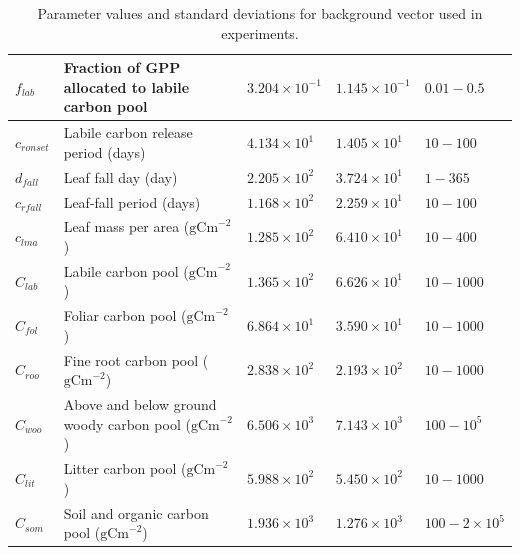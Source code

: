 \begin{table}[ht]
\begin{center}
\begin{tabular}{| l | p{4.5cm} | p{1.7cm} | p{1.7cm} | p{1.7cm} |}
$f_{lab}$ & Fraction of GPP allocated to labile carbon pool & $3.204\times 10^{-1}$ & $1.145\times 10^{-1}$ & $0.01 - 0.5$ \\ \hline
$c_{ronset}$ & Labile carbon release period (days) & $4.134\times 10^{1}$ & $1.405\times 10^{1}$ & $10 - 100$ \\ \hline
$d_{fall}$ & Leaf fall day (day) & $2.205\times 10^{2}$ & $3.724\times 10^{1}$ & $1 - 365$ \\ \hline
$c_{rfall}$ & Leaf-fall period (days) & $1.168\times 10^{2}$ & $2.259\times 10^{1}$ & $10 - 100$ \\ \hline
$c_{lma}$ & Leaf mass per area ($\text{gCm}^{-2}$) & $1.285\times 10^{2}$ & $6.410\times 10^{1}$ & $10 - 400$ \\ \hline
$C_{lab}$ & Labile carbon pool ($\text{gCm}^{-2}$) & $1.365\times 10^{2}$ & $6.626\times 10^{1}$ & $10 - 1000$ \\ \hline
$C_{fol}$ & Foliar carbon pool ($\text{gCm}^{-2}$) & $6.864\times 10^{1}$ & $3.590\times 10^{1}$ & $10 - 1000$ \\ \hline
$C_{roo}$ & Fine root carbon pool ($\text{gCm}^{-2}$) & $2.838\times 10^{2}$ & $2.193\times 10^{2}$ & $10 - 1000$ \\ \hline
$C_{woo}$ & Above and below ground woody carbon pool ($\text{gCm}^{-2}$) & $6.506\times 10^{3}$ & $7.143\times 10^{3}$ & $100 - 10^{5}$ \\ \hline
$C_{lit}$ & Litter carbon pool ($\text{gCm}^{-2}$) & $5.988\times 10^{2}$ & $5.450\times 10^{2}$ & $10 - 1000$ \\ \hline
$C_{som}$ & Soil and organic carbon pool ($\text{gCm}^{-2}$) & $1.936\times 10^{3}$ & $1.276\times 10^{3}$ & $100 - 2 \times 10^{5}$  \\ \hline
	\end{tabular}
	\caption{Parameter values and standard deviations for background vector used in experiments.}
	\label{chap6:table:xbvars}
\end{center} 
\end{table}


